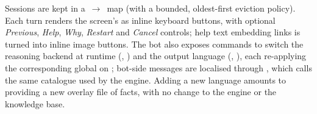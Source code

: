 Sessions are kept in a \,$\to$\, map (with a
bounded, oldest-first eviction policy). Each turn renders the screen's
 as inline keyboard buttons, with optional \emph{Previous},
\emph{Help}, \emph{Why}, \emph{Restart} and \emph{Cancel} controls; help text
embedding  links is turned into inline image buttons.
The bot also exposes commands to switch the reasoning backend at runtime
(, ) and the output language (, ),
each re-applying the corresponding global on ; bot-side messages
are localised through , which calls the same  catalogue
used by the engine. Adding a new language amounts to providing a new overlay file
of  facts, with no change to the engine or the knowledge base.
